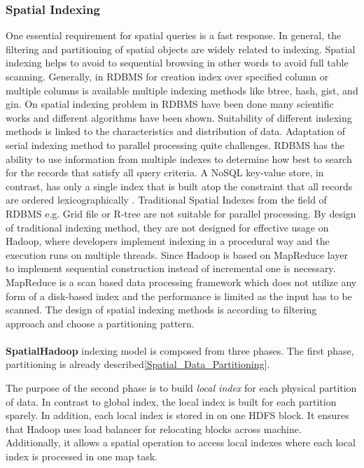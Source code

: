 \documentclass[a4paper,12pt,oneside]{report}
\begin{document}
		\subsubsection{Spatial Indexing}
		\label{Spatial_Indexing}
One essential requirement for spatial queries is a fast response. 
In general, the filtering and partitioning  of spatial objects are widely related to indexing. 
Spatial indexing helps to avoid to sequential browsing in other words to avoid full table scanning.
Generally, in RDBMS for creation index over specified column or multiple columns is available multiple 
indexing methods like btree, hash, gist, and gin. On spatial indexing problem in RDBMS have 
been done many scientific works and different algorithms have been shown. Suitability of 
different indexing methods is linked to the characteristics and distribution of data. 
Adaptation of serial indexing method to parallel processing quite challenges. 
RDBMS has the ability to use information from multiple indexes to determine how best
to search for the records that satisfy all query criteria. A
NoSQL key-value store, in contrast, has only a single index
that is built atop the constraint that all records are ordered
lexicographically . Traditional 
Spatial Indexes from the field of RDBMS e.g. Grid file or R-tree are not suitable for parallel 
processing. By design of traditional indexing method, they are not designed for effective 
usage on Hadoop, where developers implement indexing in a procedural way and the execution 
runs on multiple threads. Since Hadoop is based on MapReduce layer to implement 
sequential construction instead of incremental one  is necessary.  
MapReduce is a scan based data processing framework which does not utilize any form of a disk-based 
index and the performance is limited as the input has to be scanned. The design of spatial indexing methods 
is according to filtering approach and choose a partitioning pattern. 



\paragraph*{} \textbf{SpatialHadoop} indexing model is composed from three phases. The first phase, partitioning is already
described\ref{Spatial_Data_Partitioning}.

The purpose of the second phase is to build \textit{local index}  for each physical partition of data. 
In contrast to global index, the local index is built for each partition sparely. In addition, each local 
index is stored in on one HDFS block. It ensures that Hadoop uses load balancer for relocating blocks 
across machine. Additionally, it allows  a spatial operation to access local indexes where each local 
index is processed in one map task. 
\end{document}
